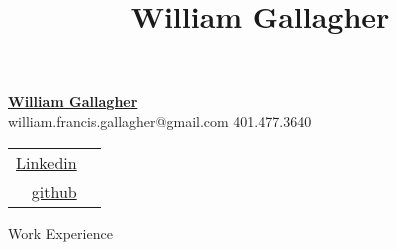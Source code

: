 \documentclass[10pt,a4paper]{article}
\title{William Gallagher}
\begin{document}
{\selectfont

\begin{tcolorbox}
  \begin{minipage}{.5\textwidth}
    \underline{\huge{\textbf{William Gallagher}}}\\
    \normalsize{william.francis.gallagher@gmail.com}
    \textbar
    \normalsize{ 401.477.3640}
  \end{minipage}
  \begin{minipage}{.5\textwidth}
      \begin{center}
        \begin{flushright}
          {\textcolor{black}
            {
              {\selectfont
                \begin{tabular} {r l}
                  \href{https://www.linkedin.com/in/william-gallagher-705199170}{Linkedin} \\
                  \href{https://github.com/william-gallagher/}{github} \\
                \end{tabular}
              }
            }
          }
        \end{flushright}
      \end{center}
  \end{minipage}
\end{tcolorbox}

\begin{tcolorbox}

  {\selectfont
    \begin{center}
      \LARGE{Work Experience}
    \end{center}
  }

  \tcblower


\end{tcolorbox}}
\end{document}
